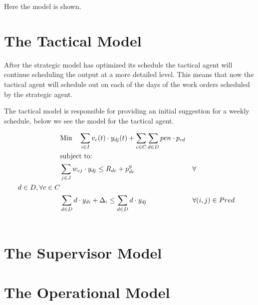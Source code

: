 Here the model is shown. 

\section{The Tactical Model}
After the strategic model has optimized its schedule the tactical agent will continue scheduling the output at a more detailed level. This means that now the tactical agent will schedule 
out on each of the days of the work orders scheduled by the strategic agent. 

The tactical model is responsible for providing an initial suggestion for a weekly schedule, below we see the model for the tactical agent.


\begin{align}
	& \text{Min} \quad \sum_{i \in I} v_{c}(t) \cdot y_{dj}(t) + \sum_{c \in C} \sum_{d \in D} pen \cdot p_{cd}\\  
	& \text{subject to:} \notag \\
	& \sum_{j \in J} w_{cj} \cdot y_{dj} \leq R_{dc} + p^y_{dc} && \forall \\ d \in D, \forall c \in C \\ 
	& \sum_{d \in D} d \cdot y_{di} + \Delta_i \leq \sum_{d \in D} d \cdot y_{dj} && \forall (i, j) \in Pred \\ 
	& 
\end{align}




\section{The Supervisor Model}


\section{The Operational Model}



